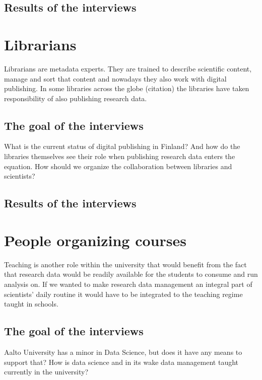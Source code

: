 \subsection{Results of the interviews}

\fi

\section{Librarians}

Librarians are metadata experts. They are trained to describe scientific
content, manage and sort that content and nowadays they also work with digital
publishing. In some libraries across the globe (citation) the libraries have
taken responsibility of also publishing research data.

\subsection{The goal of the interviews}

What is the current status of digital publishing in Finland? And how do the
libraries themselves see their role when publishing research data enters the
equation. How should we organize the collaboration between libraries and
scientists?

\subsection{Results of the interviews}

\section{People organizing courses}

Teaching is another role within the university that would benefit from the fact
that research data would be readily available for the students to consume and
run analysis on. If we wanted to make research data management an integral part
of scientists' daily routine it would have to be integrated to the teaching
regime taught in schools.

\subsection{The goal of the interviews}

Aalto University has a minor in Data Science, but does it have any means to
support that? How is data science and in its wake data management taught
currently in the university?

